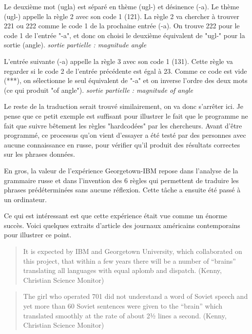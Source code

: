 \documentclass[11pt,a4paper]{report}
\begin{document}
  Le deuxième mot (ugla) est séparé en thème (ugl-) et désinence (-a). 
  Le thème (ugl-) appelle la règle 2 avec son code 1 (121). La règle 2 va chercher à trouver 221 ou 222 
  comme le code 1 de la prochaine entrée (-a). On trouve 222 pour le code 1 de l'entrée 
  "-a", et donc on choisi le deuxième équivalent de "ugl-" pour la sortie (angle). \newline 
  \textit{sortie partielle : magnitude angle}

  L'entrée suivante (-a) appelle la règle 3 avec son code 1 (131). Cette règle va regarder si le 
  code 2 de l'entrée précédente est égal à 23. Comme ce code est vide (***), on sélectionne le seul 
  équivalent de "-a" et on inverse l'ordre des deux mots (ce qui produit "of angle"). \newline
  \textit{sortie partielle : magnitude of angle}

  Le reste de la traduction serait trouvé similairement, on va donc s'arrêter ici. Je pense que ce 
  petit exemple est suffisant pour illustrer le fait que le programme ne fait que suivre bêtement les 
  règles "hardcodées" par les chercheurs. Avant d'être programmé, ce processus qu'on vient d'essayer 
  a été testé par des personnes avec aucune connaissance en russe, pour vérifier qu'il produit des 
  résultats correctes sur les phrases données. 

  En gros, la valeur de l'expérience Georgetown-IBM repose dans l'analyse de la grammaire russe et dans 
  l'invention des 6 règles qui permettent de traduire les phrases prédéterminées sans aucune réflexion. 
  Cette tâche a ensuite été passé à un ordinateur. 

  Ce qui est intéressant est que cette expérience était vue comme un énorme succès. Voici quelques 
  extraits d'article des journaux américains contemporains pour illustrer ce point.
  \begin{quote} 
  It is expected by IBM and Georgetown University, which collaborated on this project,
  that within a few years there will be a number of “brains” translating all languages
  with equal aplomb and dispatch. (Kenny, Christian Science Monitor)
  \end{quote}

  \begin{quote}
  The girl who operated 701 did not understand a word of Soviet speech and yet more
  than 60 Soviet sentences were given to the “brain” which translated smoothly at the
  rate of about 2½ lines a second. (Kenny, Christian Science Monitor)
  \end{quote}
  
\end{document}
